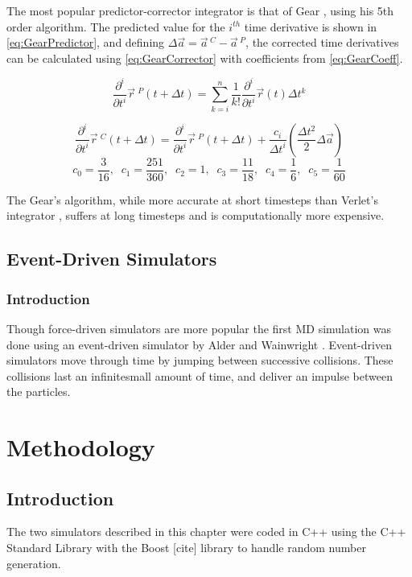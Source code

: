 \documentclass[12pt]{UoAthesis}
\begin{document}
The most popular predictor-corrector integrator is that of Gear
\cite{Gear1971}, using his 5th order algorithm. The predicted value for
the $i^{th}$ time derivative is shown in \eqref{eq:GearPredictor}, and
defining $\Delta \vec{a} = \vec{a}\,^{C} - \vec{a}\,^{P}$, the
corrected time derivatives can be calculated using
\eqref{eq:GearCorrector} with coefficients from \eqref{eq:GearCoeff}.

\begin{equation}
  \frac{\partial^{i}}{\partial t^{i}} \vec{r}\:^{P}(t+\Delta t) = \sum^{n}_{k=i} \frac{1}{k!}\frac{\partial^{i} }{\partial t^{i}} \vec{r}(t) \Delta t^{k} \label{eq:GearPredictor}
\end{equation}

\begin{equation}
  \frac{\partial^{i}}{\partial t^{i}} \vec{r}\:^{C}(t+\Delta t) = \frac{\partial^{i} }{\partial t^{i}} \vec{r}\:^{P}(t+\Delta t) +\frac{c_i}{\Delta t^i} \left(\frac{\Delta t^2}{2}\Delta \vec{a}\right)  \label{eq:GearCorrector}
\end{equation}
\begin{equation}
  c_0 = \frac{3}{16},\;\; c_1 = \frac{251}{360},\;\; c_2 = 1,\;\; c_3 = \frac{11}{18},\;\; c_4 = \frac{1}{6},\;\; c_5 = \frac{1}{60} \label{eq:GearCoeff}
\end{equation}

The Gear's algorithm, while more accurate at short timesteps than Verlet's integrator \cite{Haile1997}, suffers at long timesteps and is computationally more expensive.

\section{Event-Driven Simulators}
\subsection{Introduction}
Though force-driven simulators are more popular the first MD
simulation was done using an event-driven simulator by Alder and
Wainwright \cite{Alder1959}. Event-driven simulators move through time
by jumping between successive collisions.  These collisions last an
infinitesmall amount of time, and deliver an impulse between the
particles.  
\chapter{Methodology}
\section{Introduction}
The two simulators described in this chapter were coded in C++ using
the C++ Standard Library with the Boost [cite] library to handle
random number generation.
\end{document}
